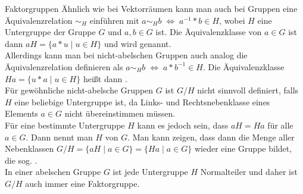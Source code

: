 \begin{Def}{Faktorgruppen}
    Ähnlich wie bei Vektorräumen kann man auch bei Gruppen eine
    Äquivalenzrelation $\sim_H$ einführen mit
    $a \sim_H b \;\Leftrightarrow\; a^{-1} \ast b \in H$, wobei $H$ eine
    Untergruppe der Gruppe $G$ und $a, b \in G$ ist.
    Die Äquivalenzklasse von $a \in G$ ist dann
    $aH = \{a \ast u \;|\; u \in H\}$ und wird
     genannt. \\
    Allerdings kann man bei nicht-abelschen Gruppen auch analog die
    Äquivalenzrelation definieren als
    $a \sim_H b \;\Leftrightarrow\; a \ast b^{-1} \in H$.
    Die Äquivalenzklasse $Ha = \{u \ast a \;|\; u \in H\}$ heißt dann
    . \\
    Für gewöhnliche nicht-abelsche Gruppen $G$ ist $G/H$ nicht sinnvoll
    definiert, falls $H$ eine beliebige Untergruppe ist, da Links- und
    Rechtsnebenklasse eines Elements $a \in G$ nicht übereinstimmen müssen. \\
    Für eine bestimmte Untergruppe $H$ kann es jedoch sein, dass $aH = Ha$
    für alle $a \in G$.
    Dann nennt man $H$  von $G$.
    Man kann zeigen, dass dann die Menge aller Nebenklassen
    $G/H = \{aH \;|\; a \in G\} = \{Ha \;|\; a \in G\}$ wieder eine Gruppe
    bildet, die sog. . \\
    In einer abelschen Gruppe $G$ ist jede Untergruppe $H$ Normalteiler und
    daher ist $G/H$ auch immer eine Faktorgruppe.
\end{Def}

\pagebreak
